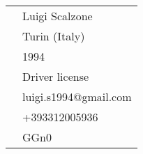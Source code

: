\textcolor{sidebartext}{
	\begin{tabular}{ll}
		\textcolor{icons}{\faMale}&Luigi Scalzone \\
		\textcolor{icons}{\faMapMarker}&Turin (Italy) \\
		\textcolor{icons}{\faBirthdayCake}&1994 \\
		\textcolor{icons}{\faCar}&Driver license\\
		\textcolor{icons}{\faEnvelope}&luigi.s1994@gmail.com\\
		\textcolor{icons}{\faPhone}&+393312005936\\
		\textcolor{icons}{\faGithub}&GGn0\\
	\end{tabular}
}